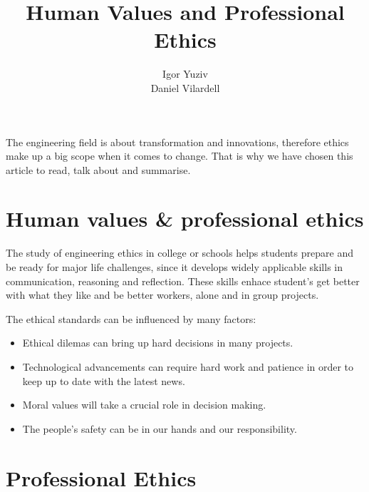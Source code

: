 \documentclass[12pt, a4papre]{article}
\author{Igor Yuziv\\
	   Daniel Vilardell}
\title{\textbf{Human Values and Professional Ethics}}
\date{}
\begin{document}
	\maketitle
	
	The engineering field is about transformation and innovations, therefore ethics make up a big scope when it comes to change. That is why we have chosen this article to read, talk about and summarise.
	
	\section{Human values \& professional ethics}
	
	The study of engineering ethics in college or schools helps students prepare and be ready for major life challenges, since it develops widely applicable skills in communication, reasoning and reflection. These skills enhace student's get better with what they like and be better workers, alone and in group projects. 
	
	The ethical standards can be influenced by many factors:
	\begin{itemize}
		\item Ethical dilemas can bring up hard decisions in many projects.
		\item Technological advancements can require hard work and patience in order to keep up to date with the latest news.
		\item Moral values will take a crucial role in decision making.
		\item The people's safety can be in our hands and our responsibility.
	\end{itemize}
	
	\section{Professional Ethics}
	
\end{document}
